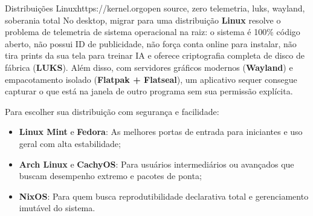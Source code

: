 \documentclass{pousadaguide}
\begin{document}
\begin{ferramenta}[goat,logo=linux]{Distribuições Linux}{https://kernel.org}{open source, zero telemetria, luks, wayland, soberania total}
No desktop, migrar para uma distribuição \textbf{Linux} resolve o problema de telemetria de sistema operacional na raiz: o sistema é 100\% código aberto, não possui ID de publicidade, não força conta online para instalar, não tira prints da sua tela para treinar IA e oferece criptografia completa de disco de fábrica (\textbf{LUKS}). Além disso, com servidores gráficos modernos (\textbf{Wayland}) e empacotamento isolado (\textbf{Flatpak + Flatseal}), um aplicativo sequer consegue capturar o que está na janela de outro programa sem sua permissão explícita.

Para escolher sua distribuição com segurança e facilidade:
\begin{itemize}
  \item \textbf{Linux Mint} e \textbf{Fedora}: As melhores portas de entrada para iniciantes e uso geral com alta estabilidade;
  \item \textbf{Arch Linux} e \textbf{CachyOS}: Para usuários intermediários ou avançados que buscam desempenho extremo e pacotes de ponta;
  \item \textbf{NixOS}: Para quem busca reprodutibilidade declarativa total e gerenciamento imutável do sistema.
\end{itemize}
\end{ferramenta}
\end{document}
